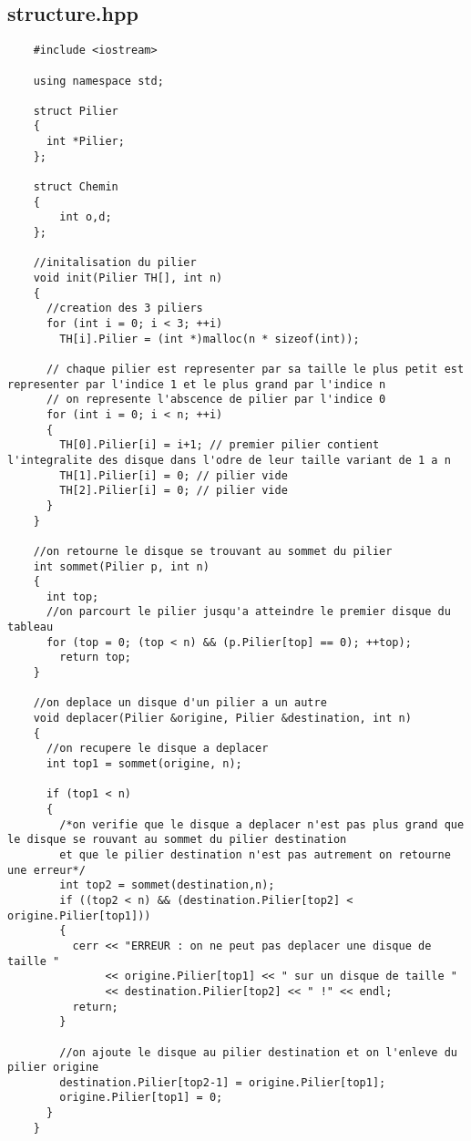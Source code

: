 \subsection*{structure.hpp}
\begin{verbatim}
    #include <iostream>

    using namespace std;
    
    struct Pilier
    {
      int *Pilier;
    };
    
    struct Chemin
    {
        int o,d;
    };
    
    //initalisation du pilier
    void init(Pilier TH[], int n)
    {
      //creation des 3 piliers
      for (int i = 0; i < 3; ++i)
        TH[i].Pilier = (int *)malloc(n * sizeof(int));
      
      // chaque pilier est representer par sa taille le plus petit est representer par l'indice 1 et le plus grand par l'indice n
      // on represente l'abscence de pilier par l'indice 0 
      for (int i = 0; i < n; ++i)
      {
        TH[0].Pilier[i] = i+1; // premier pilier contient l'integralite des disque dans l'odre de leur taille variant de 1 a n
        TH[1].Pilier[i] = 0; // pilier vide
        TH[2].Pilier[i] = 0; // pilier vide
      }
    }
    
    //on retourne le disque se trouvant au sommet du pilier
    int sommet(Pilier p, int n)
    {
      int top;
      //on parcourt le pilier jusqu'a atteindre le premier disque du tableau 
      for (top = 0; (top < n) && (p.Pilier[top] == 0); ++top);
        return top;
    }
    
    //on deplace un disque d'un pilier a un autre
    void deplacer(Pilier &origine, Pilier &destination, int n)
    {
      //on recupere le disque a deplacer
      int top1 = sommet(origine, n);
    
      if (top1 < n)
      {
        /*on verifie que le disque a deplacer n'est pas plus grand que le disque se rouvant au sommet du pilier destination
        et que le pilier destination n'est pas autrement on retourne une erreur*/
        int top2 = sommet(destination,n);
        if ((top2 < n) && (destination.Pilier[top2] < origine.Pilier[top1])) 
        {
          cerr << "ERREUR : on ne peut pas deplacer une disque de taille "
               << origine.Pilier[top1] << " sur un disque de taille "
               << destination.Pilier[top2] << " !" << endl;
          return;
        }
    
        //on ajoute le disque au pilier destination et on l'enleve du pilier origine
        destination.Pilier[top2-1] = origine.Pilier[top1];
        origine.Pilier[top1] = 0;
      }
    }
    

\end{verbatim}
